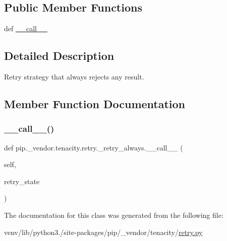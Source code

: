 \subsection*{Public Member Functions}
\begin{DoxyCompactItemize}
\item 
def \hyperlink{classpip_1_1__vendor_1_1tenacity_1_1retry_1_1__retry__always_aaadeba56739015887b158ec489bb348a}{\+\_\+\+\_\+call\+\_\+\+\_\+}
\end{DoxyCompactItemize}


\subsection{Detailed Description}
\begin{DoxyVerb}Retry strategy that always rejects any result.\end{DoxyVerb}
 

\subsection{Member Function Documentation}
\mbox{\label{classpip_1_1__vendor_1_1tenacity_1_1retry_1_1__retry__always_aaadeba56739015887b158ec489bb348a}} 
\subsubsection{\texorpdfstring{\+\_\+\+\_\+call\+\_\+\+\_\+()}{\_\_call\_\_()}}
{\footnotesize\ttfamily def pip.\+\_\+vendor.\+tenacity.\+retry.\+\_\+retry\+\_\+always.\+\_\+\+\_\+call\+\_\+\+\_\+ (\begin{DoxyParamCaption}\item[{}]{self,  }\item[{}]{retry\+\_\+state }\end{DoxyParamCaption})}



The documentation for this class was generated from the following file\+:\begin{DoxyCompactItemize}
\item 
venv/lib/python3./site-\/packages/pip/\+\_\+vendor/tenacity/\hyperlink{tenacity_2retry_8py}{retry.\+py}\end{DoxyCompactItemize}
